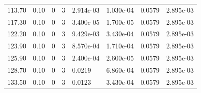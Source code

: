 \documentclass[preview]{standalone}
\begin{document}
{{\begin{tabular}{L{1.2cm}C{1.2cm} C{0.3cm}C{0.5cm} C{1.4cm}C{1.4cm} C{1.4cm}C{1.4cm}}
  113.70  &  0.10  & 0     &  3 &  2.914e-03  & 1.030e-04  & 0.0579 &  2.895e-03   \\ 
  117.30  &  0.10  & 0     &  3 &  3.400e-05  & 1.700e-05  & 0.0579 &  2.895e-03   \\ 
  122.20  &  0.10  & 0     &  3 &  9.429e-03  & 3.430e-04  & 0.0579 &  2.895e-03   \\ 
  123.90  &  0.10  & 0     &  3 &  8.570e-04  & 1.710e-04  & 0.0579 &  2.895e-03   \\ 
  125.90  &  0.10  & 0     &  3 &  2.400e-04  & 2.600e-05  & 0.0579 &  2.895e-03   \\ 
  128.70  &  0.10  & 0     &  3 &  0.0219  & 6.860e-04  & 0.0579 &  2.895e-03   \\ 
  133.50  &  0.10  & 0     &  3 &  0.0123  & 3.430e-04  & 0.0579 &  2.895e-03   \\ 
\hline 
\end{tabular} 

}}
\end{document}
